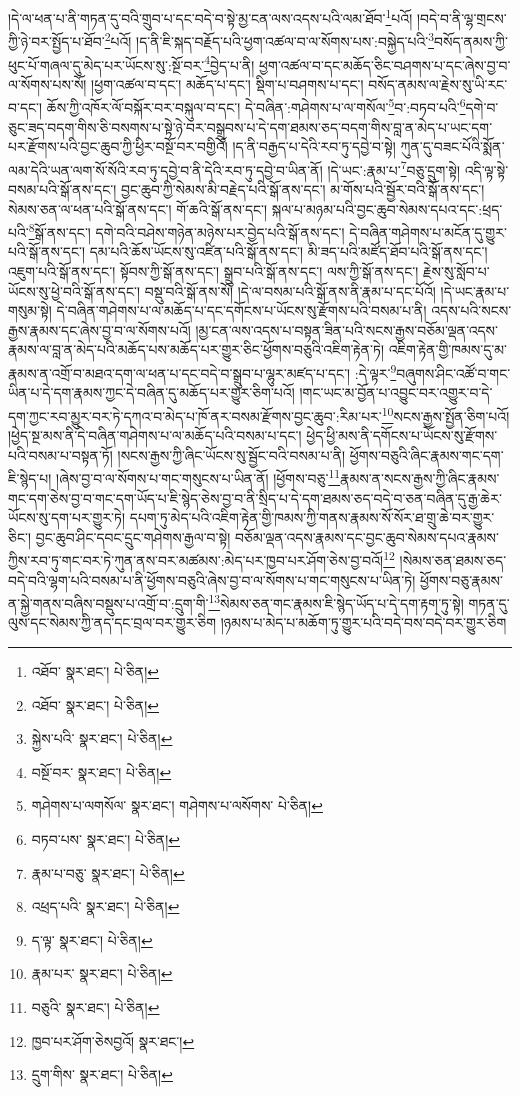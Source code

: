།དེ་ལ་ཕན་པ་ནི་གཏན་དུ་བའི་གྲུབ་པ་དང་བདེ་བ་སྟེ་མྱ་ངན་ལས་འདས་པའི་ལམ་ཐོབ་\footnote{འཐོབ་  སྣར་ཐང་།  པེ་ཅིན། }པའོ། །བདེ་བ་ནི་ལྷ་གྲངས་ཀྱི་ཉེ་བར་སྤྱོད་པ་ཐོབ་\footnote{འཐོབ་  སྣར་ཐང་།  པེ་ཅིན། }པའོ། །ད་ནི་ཇི་སྐད་བརྗོད་པའི་ཕྱག་འཚལ་བ་ལ་སོགས་པས་:བསྐྱེད་པའི་\footnote{སྐྱེས་པའི་  སྣར་ཐང་།  པེ་ཅིན། }བསོད་ནམས་ཀྱི་ཕུང་པོ་གཞལ་དུ་མེད་པར་ཡོངས་སུ་:སྔོ་བར་\footnote{བསྔོ་བར་  སྣར་ཐང་།  པེ་ཅིན། }བྱེད་པ་ནི། ཕྱག་འཚལ་བ་དང་མཆོད་ཅིང་བཤགས་པ་དང་ཞེས་བྱ་བ་ལ་སོགས་པས་སོ། །ཕྱག་འཚལ་བ་དང་། མཆོད་པ་དང་། སྡིག་པ་བཤགས་པ་དང་། བསོད་ནམས་ལ་རྗེས་སུ་ཡི་རང་བ་དང་། ཆོས་ཀྱི་འཁོར་ལོ་བསྐོར་བར་བསྐུལ་བ་དང་། དེ་བཞིན་:གཤེགས་པ་ལ་གསོལ་\footnote{གཤེགས་པ་ལགསོལ་  སྣར་ཐང་། གཤེགས་པ་ལསོགས་  པེ་ཅིན། }བ་:བཏབ་པའི་\footnote{བཏབ་པས་  སྣར་ཐང་།  པེ་ཅིན། }དགེ་བ་ཅུང་ཟད་བདག་གིས་ཅི་བསགས་པ་སྟེ་ཉེ་བར་བསྒྲུབས་པ་དེ་དག་ཐམས་ཅད་བདག་གིས་བླ་ན་མེད་པ་ཡང་དག་པར་རྫོགས་པའི་བྱང་ཆུབ་ཀྱི་ཕྱིར་བསྔོ་བར་བགྱིའོ། །ད་ནི་བརྒྱད་པ་དེའི་རབ་ཏུ་དབྱེ་བ་སྟེ། ཀུན་དུ་བཟང་པོའི་སྨོན་ལམ་དེའི་ཡན་ལག་སོ་སོའི་རབ་ཏུ་དབྱེ་བ་ནི་དེའི་རབ་ཏུ་དབྱེ་བ་ཡིན་ནོ། །དེ་ཡང་:རྣམ་པ་\footnote{རྣམ་པ་བཅུ་  སྣར་ཐང་།  པེ་ཅིན། }བཅུ་དྲུག་སྟེ། འདི་ལྟ་སྟེ་བསམ་པའི་སྒོ་ནས་དང་། བྱང་ཆུབ་ཀྱི་སེམས་མི་བརྗེད་པའི་སྒོ་ནས་དང་། མ་གོས་པའི་སྦྱོར་བའི་སྒོ་ནས་དང་། སེམས་ཅན་ལ་ཕན་པའི་སྒོ་ནས་དང་། གོ་ཆའི་སྒོ་ནས་དང་། སྐལ་པ་མཉམ་པའི་བྱང་ཆུབ་སེམས་དཔའ་དང་:ཕྲད་པའི་\footnote{འཕྲད་པའི་  སྣར་ཐང་།  པེ་ཅིན། }སྒོ་ནས་དང་། དགེ་བའི་བཤེས་གཉེན་མཉེས་པར་བྱེད་པའི་སྒོ་ནས་དང་། དེ་བཞིན་གཤེགས་པ་མངོན་དུ་གྱུར་པའི་སྒོ་ནས་དང་། དམ་པའི་ཆོས་ཡོངས་སུ་འཛིན་པའི་སྒོ་ནས་དང་། མི་ཟད་པའི་མཛོད་ཐོབ་པའི་སྒོ་ནས་དང་། འཇུག་པའི་སྒོ་ནས་དང་། སྟོབས་ཀྱི་སྒོ་ནས་དང་། སྒྲུབ་པའི་སྒོ་ནས་དང་། ལས་ཀྱི་སྒོ་ནས་དང་། རྗེས་སུ་སློབ་པ་ཡོངས་སུ་ཕྱེ་བའི་སྒོ་ནས་དང་། བསྡུ་བའི་སྒོ་ནས་སོ། །དེ་ལ་བསམ་པའི་སྒོ་ནས་ནི་རྣམ་པ་དང་པོའོ། །དེ་ཡང་རྣམ་པ་གསུམ་སྟེ། དེ་བཞིན་གཤེགས་པ་ལ་མཆོད་པ་དང་དགོངས་པ་ཡོངས་སུ་རྫོགས་པའི་བསམ་པ་ནི། འདས་པའི་སངས་རྒྱས་རྣམས་དང་ཞེས་བྱ་བ་ལ་སོགས་པའོ། །མྱ་ངན་ལས་འདས་པ་བསྟན་ཟིན་པའི་སངས་རྒྱས་བཅོམ་ལྡན་འདས་རྣམས་ལ་བླ་ན་མེད་པའི་མཆོད་པས་མཆོད་པར་གྱུར་ཅིང་ཕྱོགས་བཅུའི་འཇིག་རྟེན་ཏེ། འཇིག་རྟེན་གྱི་ཁམས་དུ་མ་རྣམས་ན་འགྲོ་བ་མཐའ་དག་ལ་ཕན་པ་དང་བདེ་བ་སྒྲུབ་པ་ལྷུར་མཛད་པ་དང་། :དེ་ལྟར་\footnote{ད་ལྟ་  སྣར་ཐང་།  པེ་ཅིན། }བཞུགས་ཤིང་འཚོ་བ་གང་ཡིན་པ་དེ་དག་རྣམས་ཀྱང་དེ་བཞིན་དུ་མཆོད་པར་གྱུར་ཅིག་པའོ། །གང་ཡང་མ་བྱོན་པ་འབྱུང་བར་འགྱུར་བ་དེ་དག་ཀྱང་རབ་མྱུར་བར་ཏེ་དཀའ་བ་མེད་པ་ཁོ་ནར་བསམ་རྫོགས་བྱང་ཆུབ་:རིམ་པར་\footnote{རྣམ་པར་  སྣར་ཐང་།  པེ་ཅིན། }སངས་རྒྱས་སྤྱོན་ཅིག་པའོ། །ཕྱེད་སྔ་མས་ནི་དེ་བཞིན་གཤེགས་པ་ལ་མཆོད་པའི་བསམ་པ་དང་། ཕྱེད་ཕྱི་མས་ནི་དགོངས་པ་ཡོངས་སུ་རྫོགས་པའི་བསམ་པ་བསྟན་ཏོ། །སངས་རྒྱས་ཀྱི་ཞིང་ཡོངས་སུ་སྦྱོང་བའི་བསམ་པ་ནི། ཕྱོགས་བཅུའི་ཞིང་རྣམས་གང་དག་ཇི་སྙེད་པ། །ཞེས་བྱ་བ་ལ་སོགས་པ་གང་གསུངས་པ་ཡིན་ནོ། །ཕྱོགས་བཅུ་\footnote{བཅུའི་  སྣར་ཐང་།  པེ་ཅིན། }རྣམས་ན་སངས་རྒྱས་ཀྱི་ཞིང་རྣམས་གང་དག་ཅེས་བྱ་བ་གང་དག་ཡོད་པ་ཇི་སྙེད་ཅེས་བྱ་བ་ནི་སྲིད་པ་དེ་དག་ཐམས་ཅད་བདེ་བ་ཅན་བཞིན་དུ་རྒྱ་ཆེར་ཡོངས་སུ་དག་པར་གྱུར་ཏེ། དཔག་ཏུ་མེད་པའི་འཇིག་རྟེན་གྱི་ཁམས་ཀྱི་གནས་རྣམས་སོ་སོར་ཐ་གྲུ་ཆེ་བར་གྱུར་ཅིང་། བྱང་ཆུབ་ཤིང་དབང་དྲུང་གཤེགས་རྒྱལ་བ་སྟེ། བཅོམ་ལྡན་འདས་རྣམས་དང་བྱང་ཆུབ་སེམས་དཔའ་རྣམས་ཀྱིས་རབ་ཏུ་གང་བར་ཏེ་ཀུན་ནས་བར་མཚམས་:མེད་པར་ཁྱབ་པར་ཤོག་ཅེས་བྱ་བའོ།\footnote{ཁྱབ་པར་ཤོག་ཅེསབྱའོ།  སྣར་ཐང་། } །སེམས་ཅན་ཐམས་ཅད་བདེ་བའི་ལྷག་པའི་བསམ་པ་ནི་ཕྱོགས་བཅུའི་ཞེས་བྱ་བ་ལ་སོགས་པ་གང་གསུངས་པ་ཡིན་ཏེ། ཕྱོགས་བཅུ་རྣམས་ན་སྐྱེ་གནས་བཞིས་བསྡུས་པ་འགྲོ་བ་:དྲུག་གི་\footnote{དྲུག་གིས་  སྣར་ཐང་།  པེ་ཅིན། }སེམས་ཅན་གང་རྣམས་ཇི་སྙེད་ཡོད་པ་དེ་དག་རྟག་ཏུ་སྟེ། གཏན་དུ་ལུས་དང་སེམས་ཀྱི་ནད་དང་བྲལ་བར་གྱུར་ཅིག །ཉམས་པ་མེད་པ་མཆོག་ཏུ་གྱུར་པའི་བདེ་བས་བདེ་བར་གྱུར་ཅིག 